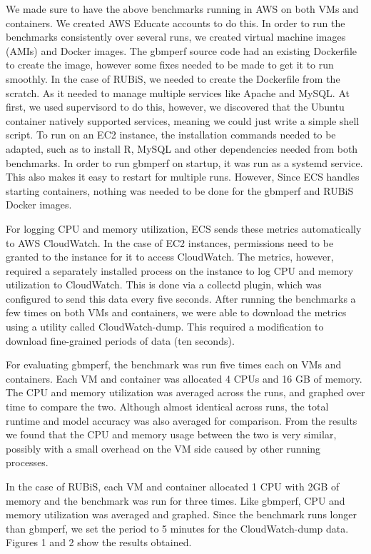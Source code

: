 \documentclass[11pt]{article}
\begin{document}
We made sure to have the above benchmarks running in AWS on both VMs and containers. We created AWS Educate accounts to do this. In order to run the benchmarks consistently over several runs, we created virtual machine images (AMIs) and Docker images. The gbmperf source code had an existing Dockerfile to create the image, however some fixes needed to be made to get it to run smoothly. In the case of RUBiS, we needed to create the Dockerfile from the scratch. As it needed to manage multiple services like Apache and MySQL. At first, we used supervisord to do this, however, we discovered that the Ubuntu container natively supported services, meaning we could just write a simple shell script. To run on an EC2 instance, the installation commands needed to be adapted, such as to install R, MySQL and other dependencies needed from both benchmarks. In order to run gbmperf on startup, it was run as a systemd service. This also makes it easy to restart for multiple runs. However, Since ECS handles starting containers, nothing was needed to be done for the gbmperf and RUBiS Docker images.

For logging CPU and memory utilization, ECS sends these metrics automatically to AWS CloudWatch. In the case of EC2 instances, permissions need to be granted to the instance for it to access CloudWatch. The metrics, however, required a separately installed process on the instance to log CPU and memory utilization to CloudWatch. This is done via a collectd plugin, which was configured to send this data every five seconds. After running the benchmarks a few times on both VMs and containers, we were able to download the metrics using a utility called CloudWatch-dump. This required a modification to download fine-grained periods of data (ten seconds).

For evaluating gbmperf, the benchmark was run five times each on VMs and containers. Each VM and container was allocated 4 CPUs and 16 GB of memory. The CPU and memory utilization was averaged across the runs, and graphed over time to compare the two. Although almost identical across runs, the total runtime and model accuracy was also averaged for comparison. From the results we found that the CPU and memory usage between the two is very similar, possibly with a small overhead on the VM side caused by other running processes.

In the case of RUBiS, each VM and container allocated 1 CPU with 2GB of memory and the benchmark was run for three times. Like gbmperf, CPU and memory utilization was averaged and graphed. Since the benchmark runs longer than gbmperf, we set the period to 5 minutes for the CloudWatch-dump data. Figures 1 and 2 show the results obtained.
\end{document}
